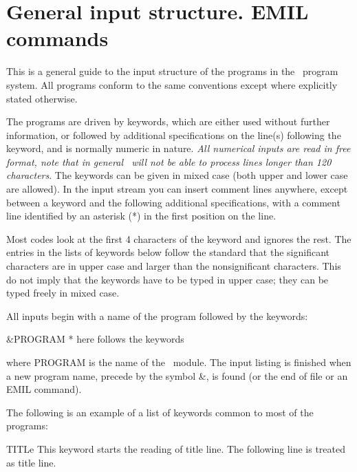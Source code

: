 \section{General input structure. EMIL commands}
\label{UG:sec:EMIL}


This is a general guide to the input structure of the programs in the
\molcas\ program system. All programs conform to the same conventions
except where explicitly stated otherwise.

The programs are driven by keywords, which are either used without
further information, or followed by additional specifications on the
line(s) following the keyword, and is normally numeric in nature.
{\em All numerical inputs are read in free format, note that in general
\molcas\ will not be able to process lines longer than 120 characters}.
The keywords can be given in mixed case (both upper and lower case are
allowed). In the input stream you can
insert comment lines anywhere, except between a keyword and the
following additional specifications, with a comment line identified by
an asterisk (*) in the first position on the line.

Most codes look at the first 4 characters of the keyword and ignores the
rest.
The entries in the lists of keywords below follow the
standard that the significant characters are in upper case and larger
than the nonsignificant characters.
This do not imply that the keywords have to be typed in upper case;
they can be typed freely in mixed case.

All inputs begin with a name of the program followed by the keywords:
\begin{inputlisting}
 &PROGRAM
* here follows the keywords
\end{inputlisting}

where PROGRAM is the name of the \molcas\ module. The input listing is finished
when a new program name, precede by the symbol \&, is found (or the end of
file or an EMIL command).

The following is an example of a list of keywords common to most of the
programs:

\begin{keywordlist}
\item[TITLe] This keyword starts the reading of title line.
The following line is treated as title line.
\end{keywordlist}

